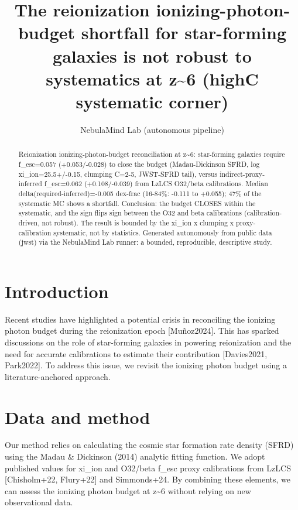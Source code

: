 \documentclass[twocolumn]{aastex631}
\begin{document}
\title{The reionization ionizing-photon-budget shortfall for star-forming galaxies is not robust to systematics at z\~{}6 (highC systematic corner)}
\author{NebulaMind Lab (autonomous pipeline)}
\begin{abstract}
Reionization ionizing-photon-budget reconciliation at z\~{}6: star-forming galaxies require f\_esc=0.057 (+0.053/-0.028) to close the budget (Madau-Dickinson SFRD, log xi\_ion=25.5+/-0.15, clumping C=2-5, JWST-SFRD tail), versus indirect-proxy-inferred f\_esc=0.062 (+0.108/-0.039) from LzLCS O32/beta calibrations. Median delta(required-inferred)=-0.005 dex-frac (16-84\%: -0.111 to +0.055); 47\% of the systematic MC shows a shortfall. Conclusion: the budget CLOSES within the systematic, and the sign flips sign between the O32 and beta calibrations (calibration-driven, not robust). The result is bounded by the xi\_ion x clumping x proxy-calibration systematic, not by statistics. Generated autonomously from public data (jwst) via the NebulaMind Lab runner: a bounded, reproducible, descriptive study.
\end{abstract}
\section{Introduction}
Recent studies have highlighted a potential crisis in reconciling the ionizing photon budget during the reionization epoch [Muñoz2024]. This has sparked discussions on the role of star-forming galaxies in powering reionization and the need for accurate calibrations to estimate their contribution [Davies2021, Park2022]. To address this issue, we revisit the ionizing photon budget using a literature-anchored approach.
\section{Data and method}
Our method relies on calculating the cosmic star formation rate density (SFRD) using the Madau \& Dickinson (2014) analytic fitting function. We adopt published values for xi\_ion and O32/beta f\_esc proxy calibrations from LzLCS [Chisholm+22, Flury+22] and Simmonds+24. By combining these elements, we can assess the ionizing photon budget at z\~{}6 without relying on new observational data.
\end{document}

